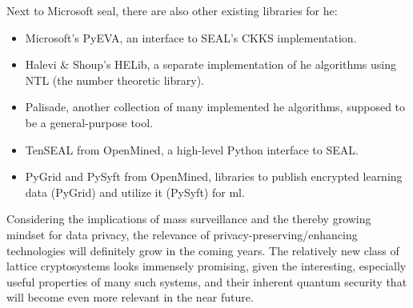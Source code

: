 Next to Microsoft \gls{seal}, there are also other existing libraries for \gls{he}:
\begin{itemize}[noitemsep]
  \item Microsoft's PyEVA, an interface to SEAL's CKKS implementation.
  \item Halevi \& Shoup's HELib, a separate implementation of \gls{he} algorithms using NTL (the number theoretic library).
  \item Palisade, another collection of many implemented \gls{he} algorithms, supposed to be a general-purpose tool.
  \item TenSEAL from OpenMined, a high-level Python interface to SEAL.
  \item PyGrid and PySyft from OpenMined, libraries to publish encrypted learning data (PyGrid) and utilize it (PySyft) for \gls{ml}.
\end{itemize}

Considering the implications of mass surveillance and the thereby growing mindset for data privacy, the relevance of privacy-preserving/enhancing technologies will definitely grow in the coming years.
The relatively new class of lattice cryptosystems looks immensely promising, given the interesting, especially useful properties of many such systems, and their inherent quantum security that will become even more relevant in the near future.
